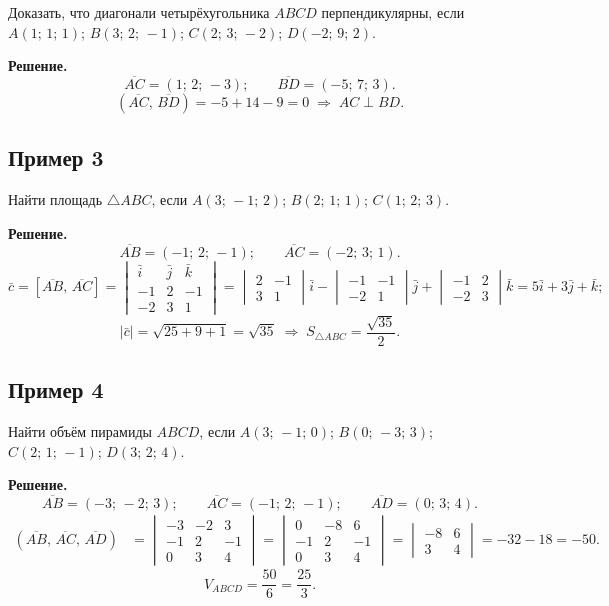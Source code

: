\documentclass[12pt,a4paper]{article}
\newcommand{\vc}{\bar{c}}
\newcommand{\vi}{\bar{i}}
\newcommand{\vj}{\bar{j}}
\newcommand{\vk}{\bar{k}}
\begin{document}
Доказать, что диагонали четырёхугольника $ABCD$ перпендикулярны, если
$A(1;\,1;\,1)$; $B(3;\,2;\,-1)$; $C(2;\,3;\,-2)$; $D(-2;\,9;\,2)$.

\textbf{Решение.}
$$
\overline{AC} = (1;\,2;\,-3); \qquad \overline{BD} = (-5;\,7;\,3).
$$
$$
(\overline{AC},\,\overline{BD}) = -5 + 14 - 9 = 0 \;\Rightarrow\; AC \perp BD.
$$

\subsection*{Пример 3}

Найти площадь $\triangle ABC$, если $A(3;\,-1;\,2)$; $B(2;\,1;\,1)$;
$C(1;\,2;\,3)$.

\textbf{Решение.}
$$
\overline{AB} = (-1;\,2;\,-1); \qquad \overline{AC} = (-2;\,3;\,1).
$$
$$
\vc = [\overline{AB},\,\overline{AC}]
=
\begin{vmatrix} \vi & \vj & \vk \\ -1 & 2 & -1 \\ -2 & 3 & 1
\end{vmatrix}
=
\begin{vmatrix}2&-1\\3&1
\end{vmatrix}\vi
-
\begin{vmatrix}-1&-1\\-2&1
\end{vmatrix}\vj
+
\begin{vmatrix}-1&2\\-2&3
\end{vmatrix}\vk
= 5\vi + 3\vj + \vk;
$$
$$
|\vc| = \sqrt{25+9+1} = \sqrt{35} \;\Rightarrow\; S_{\triangle ABC} =
\frac{\sqrt{35}}{2}.
$$

\subsection*{Пример 4}

Найти объём пирамиды $ABCD$, если
$A(3;\,-1;\,0)$; $B(0;\,-3;\,3)$; $C(2;\,1;\,-1)$; $D(3;\,2;\,4)$.

\textbf{Решение.}
$$
\overline{AB} = (-3;\,-2;\,3); \qquad
\overline{AC} = (-1;\,2;\,-1); \qquad
\overline{AD} = (0;\,3;\,4).
$$
\begin{align*}
  (\overline{AB},\,\overline{AC},\,\overline{AD})
  &=
  \begin{vmatrix}
    -3 & -2 & 3 \\
    -1 &  2 & -1 \\
    0 &  3 & 4
  \end{vmatrix}
  =
  \begin{vmatrix}
    0 & -8 & 6 \\
    -1 &  2 & -1 \\
    0 &  3 & 4
  \end{vmatrix}
  =
  \begin{vmatrix}-8&6\\3&4
  \end{vmatrix}
  = -32 - 18 = -50.
\end{align*}
$$
V_{ABCD} = \frac{50}{6} = \frac{25}{3}.
$$
\end{document}
